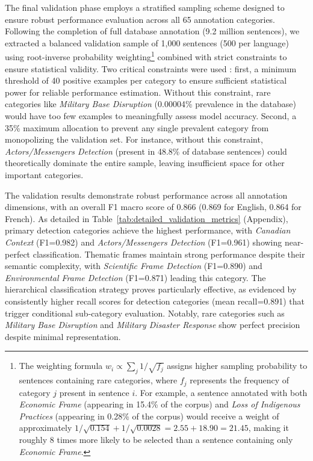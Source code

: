 The final validation phase employs a stratified sampling scheme designed to ensure robust performance evaluation across all 65 annotation categories. Following the completion of full database annotation (9.2 million sentences), we extracted a balanced validation sample of 1,000 sentences (500 per language) using root-inverse probability weighting\footnote{The weighting formula $w_i \propto \sum_j 1/\sqrt{f_j}$ assigns higher sampling probability to sentences containing rare categories, where $f_j$ represents the frequency of category $j$ present in sentence $i$. For example, a sentence annotated with both \textit{Economic Frame} (appearing in 15.4\% of the corpus) and \textit{Loss of Indigenous Practices} (appearing in 0.28\% of the corpus) would receive a weight of approximately $1/\sqrt{0.154} + 1/\sqrt{0.0028} = 2.55 + 18.90 = 21.45$, making it roughly 8 times more likely to be selected than a sentence containing only \textit{Economic Frame}.} combined with strict constraints to ensure statistical validity. Two critical constraints were used : first, a minimum threshold of 40 positive examples per category to ensure sufficient statistical power for reliable performance estimation. Without this constraint, rare categories like \textit{Military Base Disruption} (0.00004\% prevalence in the database) would have too few examples to meaningfully assess model accuracy. Second, a 35\% maximum allocation to prevent any single prevalent category from monopolizing the validation set. For instance, without this constraint, \textit{Actors/Messengers Detection} (present in 48.8\% of database sentences) could theoretically dominate the entire sample, leaving insufficient space for other important categories.

The validation results demonstrate robust performance across all annotation dimensions, with an overall F1 macro score of 0.866 (0.869 for English, 0.864 for French). As detailed in Table~\ref{tab:detailed_validation_metrics} (Appendix), primary detection categories achieve the highest performance, with \textit{Canadian Context} (F1=0.982) and \textit{Actors/Messengers Detection} (F1=0.961) showing near-perfect classification. Thematic frames maintain strong performance despite their semantic complexity, with \textit{Scientific Frame Detection} (F1=0.890) and \textit{Environmental Frame Detection} (F1=0.871) leading this category. The hierarchical classification strategy proves particularly effective, as evidenced by consistently higher recall scores for detection categories (mean recall=0.891) that trigger conditional sub-category evaluation. Notably, rare categories such as \textit{Military Base Disruption} and \textit{Military Disaster Response} show perfect precision despite minimal representation.

